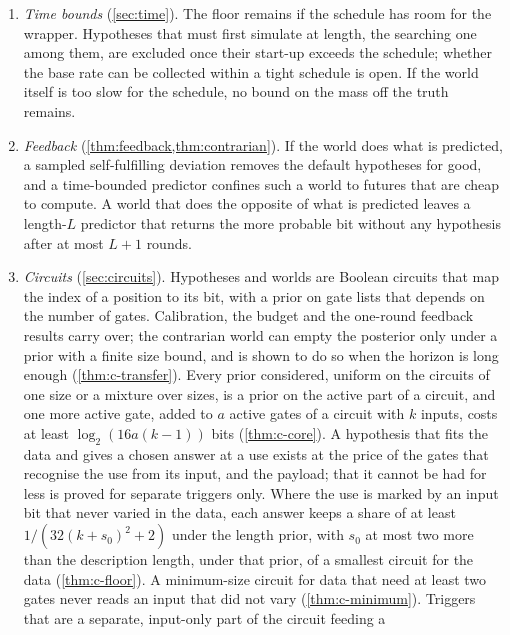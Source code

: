 \begin{enumerate}[leftmargin=1.6em,itemsep=2pt,topsep=3pt]
can express, the chance over all of them is bounded in terms of the attacker's weight and the world's mass,
whatever $n$. Running the block $n$ times at a class changes where a stake-maximiser puts its weight in the
model and leaves unchanged the weight that a majority there costs (\cref{prop:repeat}).
\item \emph{Time bounds} (\cref{sec:time}). The floor remains if the schedule has room for the wrapper.
Hypotheses that must first simulate at length, the searching one among them, are excluded once their start-up
exceeds the schedule; whether the base rate can be collected within a tight schedule is open. If the world
itself is too slow for the schedule, no bound on the mass off the truth remains.
\item \emph{Feedback} (\cref{thm:feedback,thm:contrarian}). If the world does what is predicted, a sampled
self-fulfilling deviation removes the default hypotheses for good, and a time-bounded predictor confines such
a world to futures that are cheap to compute. A world that does the opposite of what is predicted leaves a
length-$L$ predictor that returns the more probable bit without any hypothesis after at most $L+1$ rounds.
\item \emph{Circuits} (\cref{sec:circuits}). Hypotheses and worlds are Boolean circuits that map the index
of a position to its bit, with a prior on gate lists that depends on the number of gates. Calibration, the
budget and the one-round feedback results carry over; the contrarian world can empty the posterior only under
a prior with a finite size bound, and is shown to do so when the horizon is long enough
(\cref{thm:c-transfer}). Every prior considered, uniform on the circuits of one size or a mixture over
sizes, is a prior on the active part of a circuit, and one more active gate, added to $a$ active gates of a
circuit
with $k$ inputs, costs at least $\log_2(16a(k-1))$ bits (\cref{thm:c-core}). A hypothesis that fits the data
and gives a chosen answer at a use exists at the price of the gates that recognise the use from its input,
and the payload; that it cannot be had for less is proved for separate triggers only. Where the use is
marked by an input bit that never varied in the data, each answer keeps a share of at least
$1/(32(k+s_0)^2+2)$ under the length prior, with $s_0$ at most two more than the description length,
under that prior, of a smallest circuit for the data (\cref{thm:c-floor}). A minimum-size circuit for data
that need at least two gates never reads an input that
did not vary (\cref{thm:c-minimum}). Triggers that are a separate, input-only part of the circuit feeding a

\end{enumerate}
